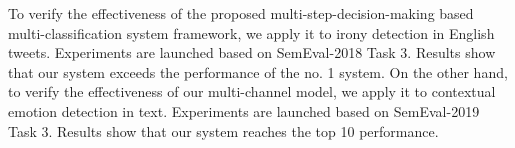 \begin{eabstract}
\begin{enumerate}
\end{enumerate}

To verify the effectiveness of the proposed multi-step-decision-making based multi-classification system framework, we apply it to irony detection in English tweets. Experiments are launched based on SemEval-2018 Task 3. Results show that our system exceeds the performance of the no. 1 system. On the other hand, to verify the effectiveness of our multi-channel model, we apply it to contextual emotion detection in text. Experiments are launched based on SemEval-2019 Task 3. Results show that our system reaches the top 10 performance.

\end{eabstract}

